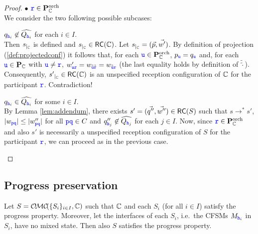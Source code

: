 \begin{proof}
$\bullet$ $\ttr \in\rolescsint$\\
We consider the two following possible subcases:
\begin{description}
\item
$q_{\hh_i}\not\in\widehat{Q_{\hh_i}}$ for each $i\in I$.\\
Then $\restrict{s}{\cs}$ is defined and $\restrict{s}{\cs} \in \RS(\cs)$. 
Let $\restrict{s}{\cs} = (\vec{p},\vec{w'})$.
By definition of projection (\cref{def:projectedconf}) it follows that, for each $\ttu\in\rolescsint$,
$p_{\ttu} = q_{\ttu}$ and, for each $\ttu\in\roles_{\cs}$ with $\ttu\neq\ttr$,   $w'_{\ttu\ttr} = w_{\tilde{\tilde{\ttu}}\tilde{\tilde{\ttr}}}= w_{\tilde{\tilde{\ttu}}\ttr}$ (the last equality holds by definition of $\widetilde{\widetilde{\cdot}}$). Consequently, $\restrict{s'}{\cs} \in \RS(\cs)$ is an unspecified reception configuration of $\cs$ for the participant $\ttr$. Contradiction!
\item

$q_{\hh_i}\in\widehat{Q_{\hh_i}}$ for some $i\in I$.\\
 By Lemma \ref{lem:addendum}, there exists $s'= (\vec{q''},\vec{w''})\in \RS(S)$ 
 such that $s \to^* s'$,
 $|w_{\ttp\ttq}| \leq |w''_{\ttp\ttq}|$ for all $\ttp\ttq \in C$ and
$q''_{\HH_j}\not\in\widehat{Q_{\HH_j}}$ for each $j\in I$. 
Now, since $\ttr\in\rolescsint$ and also $s'$ is necessarily a unspecified reception configuration of $S$ for the participant $\ttr$, we can proceed as in the previous case.
\end{description}
\end{proof}




\subsection{Progress preservation}


\begin{proposition}%
\label{lem:restrRS}
Let $S = \MC(\Set{S_i}_{i\in I}, \cs)$ such that $\cs$ and each $S_i$ (for all $i\in I$) satisfy 
the progress property. 
 Moreover, let the interfaces of each $S_i$,
i.e.\ the CFSMs $M_{\hh_i}$ in $S_i$, have no mixed state.
Then also $S$ satisfies the progress property. 
\end{proposition}

